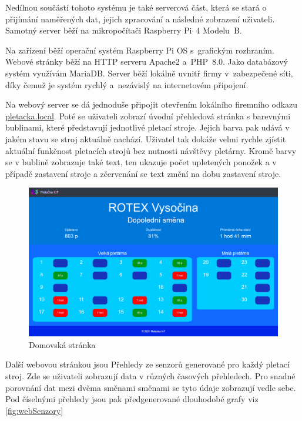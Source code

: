\documentclass{template/socthesis}
\begin{document}
Nedílnou součástí tohoto systému je také serverová část, která se stará o přijímání naměřených dat, jejich zpracování a následné zobrazení uživateli.
Samotný server běží na mikropočítači Raspberry Pi~4 Modelu~B.

Na zařízení běží operační systém Raspberry Pi OS s~grafickým rozhraním.
Webové stránky běží na HTTP serveru Apache2 a~PHP~8.0.
Jako databázový systém využívám MariaDB.
Server běží lokálně uvnitř firmy v~zabezpečené síti, díky čemuž je systém rychlý a~nezávislý na internetovém připojení.

Na webový server se dá jednoduše připojit otevřením lokálního firemního odkazu \href{http://pletacka.local}{pletacka.local}.
Poté se uživateli zobrazí úvodní přehledová stránka s barevnými bublinami, které představují jednotlivé pletací stroje.
Jejich barva pak udává v jakém stavu se stroj aktuálně nachází. Uživatel tak dokáže velmi rychle zjístit aktuální funkčnost pletacích strojů bez nutnosti návštěvy pletárny.
Kromě barvy se v bublině zobrazuje také text, ten ukazuje počet upletených ponožek a v případě zastavení stroje a zčervenání se text změní na dobu zastavení stroje.

\begin{figure}[htbp]
    \centering
    \includegraphics[width=\textwidth]{img/Uvod.png}
    \caption{Domovská stránka}
    \label{fig:webUvod}
\end{figure}

Další webovou stránkou jsou Přehledy ze senzorů generované pro každý pletací stroj.
Zde se uživateli zobrazují data v různých časových přehledech.
Pro snadné porovnání dat mezi dvěma směnami směnami se tyto údaje zobrazují vedle sebe.
Pod číselnými přehledy jsou pak předgenerované dlouhodobé grafy viz \ref{fig:webSenzory}
\end{document}

